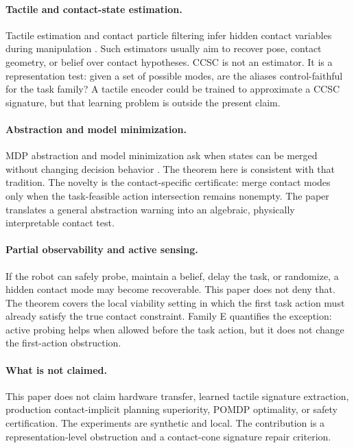 \documentclass{article}
\begin{document}
\paragraph{Tactile and contact-state estimation.}
Tactile estimation and contact particle filtering infer hidden contact variables during manipulation \citep{koval2015}. Such estimators usually aim to recover pose, contact geometry, or belief over contact hypotheses. CCSC is not an estimator. It is a representation test: given a set of possible modes, are the aliases control-faithful for the task family? A tactile encoder could be trained to approximate a CCSC signature, but that learning problem is outside the present claim.

\paragraph{Abstraction and model minimization.}
MDP abstraction and model minimization ask when states can be merged without changing decision behavior \citep{givan2003}. The theorem here is consistent with that tradition. The novelty is the contact-specific certificate: merge contact modes only when the task-feasible action intersection remains nonempty. The paper translates a general abstraction warning into an algebraic, physically interpretable contact test.

\paragraph{Partial observability and active sensing.}
If the robot can safely probe, maintain a belief, delay the task, or randomize, a hidden contact mode may become recoverable. This paper does not deny that. The theorem covers the local viability setting in which the first task action must already satisfy the true contact constraint. Family E quantifies the exception: active probing helps when allowed before the task action, but it does not change the first-action obstruction.

\paragraph{What is not claimed.}
This paper does not claim hardware transfer, learned tactile signature extraction, production contact-implicit planning superiority, POMDP optimality, or safety certification. The experiments are synthetic and local. The contribution is a representation-level obstruction and a contact-cone signature repair criterion.
\end{document}
